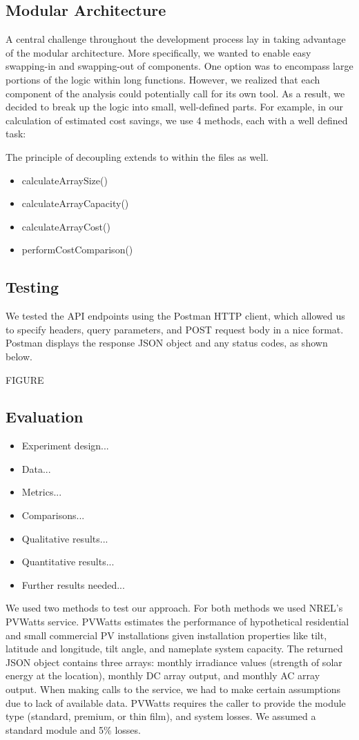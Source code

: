 \documentclass[pageno]{jpaper}
\begin{document}
\subsection{Modular Architecture}
A central challenge throughout the development process lay in taking advantage of the modular architecture. More specifically, we wanted to enable easy swapping-in and swapping-out of components. One option was to encompass large portions of the logic within long functions. However, we realized that each component of the analysis could potentially call for its own tool. As a result, we decided to break up the logic into small, well-defined parts. For example, in our calculation of estimated cost savings, we use 4 methods, each with a well defined task:

The principle of decoupling extends to within the files as well. 

\begin{itemize}
\item calculateArraySize()
\item calculateArrayCapacity()
\item calculateArrayCost()
\item performCostComparison()
\end{itemize}

\subsection{Testing}
We tested the API endpoints using the Postman HTTP client, which allowed us to specify headers, query parameters, and POST request body in a nice format. Postman displays the response JSON object and any status codes, as shown below.

FIGURE

\subsection{Evaluation}
\begin{itemize}
\item Experiment design...
\item Data...
\item Metrics...
\item Comparisons...
\item Qualitative results...
\item Quantitative results...
\item Further results needed...
\end{itemize}
We used two methods to test our approach. For both methods we used NREL's PVWatts service. PVWatts estimates the performance of hypothetical residential and small commercial PV installations given installation properties like tilt, latitude and longitude, tilt angle, and nameplate system capacity. The returned JSON object contains three arrays: monthly irradiance values (strength of solar energy at the location), monthly DC array output, and monthly AC array output. When making calls to the service, we had to make certain assumptions due to lack of available data. PVWatts requires the caller to provide the module type (standard, premium, or thin film), and system losses. We assumed a standard module and 5\% losses.
\end{document}
